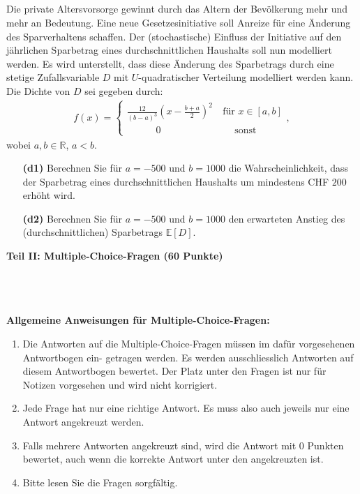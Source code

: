 \subsection*{}
Die private Altersvorsorge gewinnt durch das Altern der Bevölkerung mehr und mehr an Bedeutung. Eine neue Gesetzesinitiative soll Anreize für eine Änderung des Sparverhaltens schaffen. Der (stochastische) Einfluss der Initiative auf den jährlichen Sparbetrag eines durchschnittlichen Haushalts soll nun modelliert werden. Es wird unterstellt, dass diese Änderung des Sparbetrags durch eine stetige Zufallsvariable $ D $ mit $ U $-quadratischer Verteilung modelliert werden kann.
Die Dichte von $ D $ sei gegeben durch:
\begin{align*}
	f(x)
	=
	\begin{cases}
		\frac{12}{(b-a)^3} \left(x - \frac{b+a}{2}\right)^2 \ &\textrm{für } x \in [a,b]\\ 
		\qquad \quad 0  \ &\quad \  \textrm{sonst}
	\end{cases},
\end{align*}
wobei $ a,b \in \mathbb{R} $, $ a < b $.

\begin{enumerate}
	\item[\textbf{(d1)}]
	Berechnen Sie für $ a = - 500 $ und $ b = 1000 $ die Wahrscheinlichkeit, dass der Sparbetrag eines durchschnittlichen Haushalts um mindestens CHF $ 200 $ erhöht wird.
	\item[\textbf{(d2)}]
	Berechnen Sie für $ a = - 500 $ und $ b = 1000 $ den erwarteten Anstieg des (durchschnittlichen) Sparbetrags $ \mathbb{E}[D] $.
\end{enumerate}
\newpage


\begin{Large}
\textbf{Teil II: Multiple-Choice-Fragen (60 Punkte)}
\end{Large}
\\
\\
\\
\textbf{Allgemeine Anweisungen für Multiple-Choice-Fragen:}
\\
\renewcommand{\labelenumi}{(\roman{enumi})}
\begin{enumerate}
\item
Die Antworten auf die Multiple-Choice-Fragen müssen im dafür vorgesehenen Antwortbogen ein-
getragen werden. Es werden ausschliesslich Antworten auf diesem Antwortbogen bewertet. Der
Platz unter den Fragen ist nur für Notizen vorgesehen und wird nicht korrigiert.

\item
Jede Frage hat nur eine richtige Antwort. Es muss also auch jeweils nur eine Antwort angekreuzt
werden.

\item
Falls mehrere Antworten angekreuzt sind, wird die Antwort mit 0 Punkten bewertet, auch wenn
die korrekte Antwort unter den angekreuzten ist.

\item
Bitte lesen Sie die Fragen sorgfältig.

\end{enumerate}
\newpage
